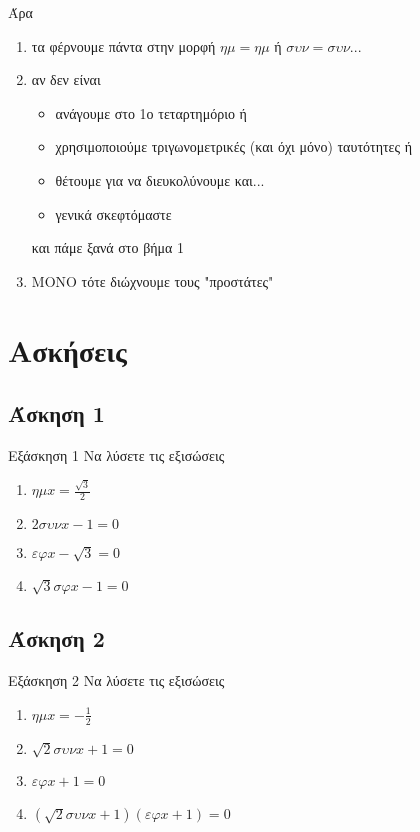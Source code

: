 \documentclass[greek]{beamer}
\begin{document}
\begin{frame}
 Άρα
 \begin{enumerate}
  \item<1-> τα φέρνουμε πάντα στην μορφή $ημ=ημ$ ή $συν=συν$...
  \item<2-> αν δεν είναι
   \begin{itemize}
    \item<3-> ανάγουμε στο 1ο τεταρτημόριο ή
    \item<4-> χρησιμοποιούμε τριγωνομετρικές (και όχι μόνο) ταυτότητες ή
    \item<5-> θέτουμε για να διευκολύνουμε και...
    \item<6-> γενικά σκεφτόμαστε
   \end{itemize}

    και πάμε ξανά στο βήμα 1

  \item<8-> ΜΟΝΟ τότε διώχνουμε τους "προστάτες"
 \end{enumerate}
\end{frame}

\section{Ασκήσεις}
\subsection{Άσκηση 1}
\begin{frame}[label=Άσκηση1]{Εξάσκηση 1}
 Να λύσετε τις εξισώσεις
 \begin{enumerate}
  \item<1-> $ημx=\frac{\sqrt{3}}{2}$
  \item<2-> $2συνx-1=0$
  \item<3-> $εφx-\sqrt{3}=0$
  \item<4-> $\sqrt{3}σφx-1=0$
 \end{enumerate}

\end{frame}

\subsection{Άσκηση 2}
\begin{frame}[label=Άσκηση2]{Εξάσκηση 2}
 Να λύσετε τις εξισώσεις
 \begin{enumerate}
  \item<1-> $ημx=-\frac{1}{2}$
  \item<2-> $\sqrt{2}συνx+1=0$
  \item<3-> $εφx+1=0$
  \item<4-> $(\sqrt{2}συνx+1)(εφx+1)=0$
 \end{enumerate}

\end{frame}
\end{document}
